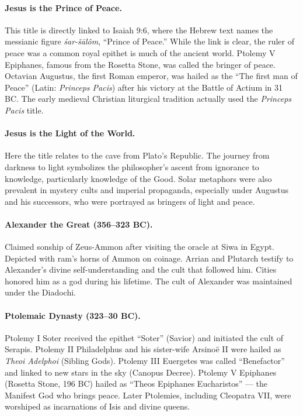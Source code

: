 \paragraph{Jesus is the Prince of Peace.}\label{par:jesus-is-the-prince-of-peace.}
This title is directly linked to Isaiah 9:6, where the Hebrew text names the messianic figure \emph{śar-šālôm}, “Prince of Peace.”
While the link is clear, the ruler of peace was a common royal epithet is much of the ancient world.
Ptolemy V Epiphanes, famous from the Rosetta Stone, was called the bringer of peace.
Octavian Augustus, the first Roman emperor, was hailed as the “The first man of Peace” (Latin: \emph{Princeps Pacis}) after his victory at the Battle of Actium in 31 BC.
The early medieval Christian liturgical tradition actually used the \emph{Princeps Pacis} title.

\paragraph{Jesus is the Light of the World.}\label{par:jesus-is-the-light-of-the-world.}
Here the title relates to the cave from Plato’s Republic.
The journey from darkness to light symbolizes the philosopher’s ascent from ignorance to knowledge, particularly knowledge of the Good. Solar metaphors were also prevalent in mystery cults and imperial propaganda, especially under Augustus and his successors, who were portrayed as bringers of light and peace.

\paragraph{Alexander the Great (356–323 BC).}
Claimed sonship of Zeus-Ammon after visiting the oracle at Siwa in Egypt.
Depicted with ram’s horns of Ammon on coinage.
Arrian and Plutarch testify to Alexander’s divine self-understanding and the cult that followed him.
Cities honored him as a god during his lifetime.
The cult of Alexander was maintained under the Diadochi.

\paragraph{Ptolemaic Dynasty (323–30 BC).}
Ptolemy I Soter received the epithet “Soter” (Savior) and initiated the cult of Serapis.
Ptolemy II Philadelphus and his sister-wife Arsinoë II were hailed as \textit{Theoi Adelphoi} (Sibling Gods).
Ptolemy III Euergetes was called “Benefactor” and linked to new stars in the sky (Canopus Decree).
Ptolemy V Epiphanes (Rosetta Stone, 196 BC) hailed as “Theos Epiphanes Eucharistos” — the Manifest God who brings peace.
Later Ptolemies, including Cleopatra VII, were worshiped as incarnations of Isis and divine queens.


